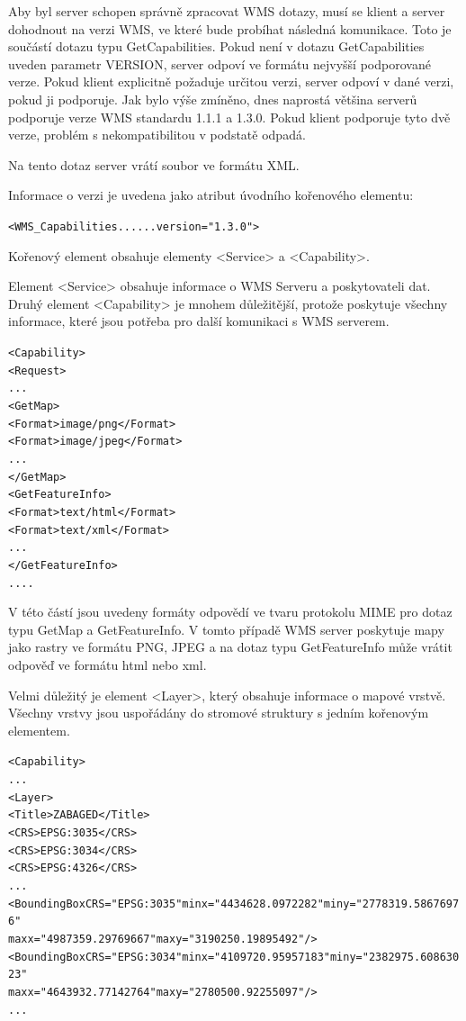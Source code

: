 \documentclass[a4paper,12pt]{article}
\begin{document}
Aby byl server schopen správně zpracovat WMS dotazy, musí se klient a server dohodnout na verzi WMS, ve které bude probíhat následná komunikace.
Toto je součástí dotazu typu GetCapabilities. Pokud není v dotazu GetCapabilities uveden parametr VERSION, server odpoví ve formátu nejvyšší podporované verze. 
Pokud klient explicitně požaduje určitou verzi, server odpoví v dané verzi, pokud ji podporuje. Jak bylo výše zmíněno, dnes naprostá většina serverů podporuje 
verze WMS standardu 1.1.1 a 1.3.0. Pokud klient podporuje tyto dvě verze, problém s nekompatibilitou v podstatě odpadá.

Na tento dotaz server vrátí soubor ve formátu XML. 

Informace o verzi je uvedena jako atribut úvodního kořenového elementu:
\begin{alltt}\footnotesize
<WMS_Capabilities...    ...version="1.3.0">
\end{alltt}

Kořenový element obsahuje elementy <Service> a <Capability>.

Element  <Service> obsahuje informace o WMS Serveru a poskytovateli dat.
Druhý element <Capability> je mnohem důležitější, protože poskytuje všechny informace, které jsou potřeba pro další komunikaci s WMS serverem.

\begin{alltt}\footnotesize
<Capability>
    <Request>
          ...
       <GetMap>
            <Format>image/png</Format>
            <Format>image/jpeg</Format>
          ...
       </GetMap>	
       <GetFeatureInfo>
            <Format>text/html</Format>
            <Format>text/xml</Format>
              ...
       </GetFeatureInfo>
           ....
\end{alltt}
V této částí jsou uvedeny formáty odpovědí ve tvaru protokolu MIME pro dotaz typu GetMap a GetFeatureInfo. V tomto případě WMS server poskytuje  mapy jako rastry ve formátu PNG, JPEG a na 
dotaz typu GetFeatureInfo může vrátit odpověď ve formátu html nebo xml.  

Velmi důležitý je element <Layer>, který obsahuje informace o mapové vrstvě. Všechny vrstvy jsou uspořádány do stromové struktury s jedním kořenovým elementem.

\begin{alltt}\footnotesize
<Capability>
    ...
  <Layer>
   <Title>ZABAGED</Title>
     <CRS>EPSG:3035</CRS>
     <CRS>EPSG:3034</CRS>
     <CRS>EPSG:4326</CRS>
      ...
     <BoundingBox CRS="EPSG:3035" minx="4434628.0972282" miny="2778319.58676976"
                                  maxx="4987359.29769667" maxy="3190250.19895492"/>
     <BoundingBox CRS="EPSG:3034" minx="4109720.95957183" miny="2382975.60863023"
                                  maxx="4643932.77142764" maxy="2780500.92255097"/>
      ...
\end{alltt}
\end{document}
